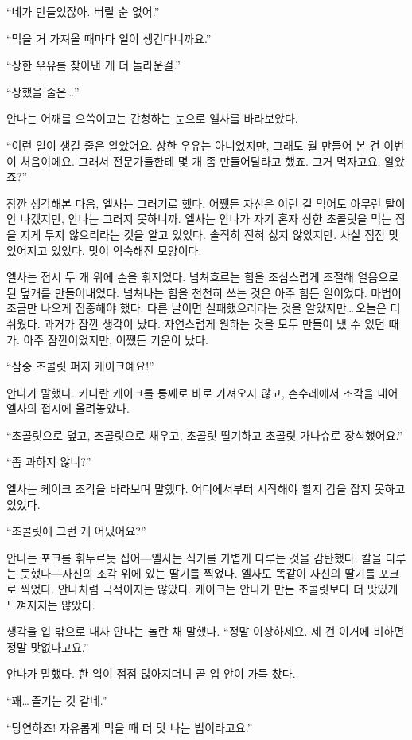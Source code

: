 ``네가 만들었잖아. 버릴 순 없어.''

``먹을 거 가져올 때마다 일이 생긴다니까요.''

``상한 우유를 찾아낸 게 더 놀라운걸.''

``상했을 줄은\ldots''

안나는 어깨를 으쓱이고는 간청하는 눈으로 엘사를 바라보았다.

``이런 일이 생길 줄은 알았어요. 상한 우유는 아니었지만, 그래도 뭘 만들어 본 건 이번이 처음이에요. 그래서 전문가들한테 몇 개 좀 만들어달라고 했죠. 그거 먹자고요, 알았죠?''

잠깐 생각해본 다음, 엘사는 그러기로 했다. 어쨌든 자신은 이런 걸 먹어도 아무런 탈이 안 나겠지만, 안나는 그러지 못하니까. 엘사는 안나가 자기 혼자 상한 초콜릿을 먹는 짐을 지게 두지 않으리라는 것을 알고 있었다. 솔직히 전혀 싫지 않았지만. 사실 점점 맛있어지고 있었다. 맛이 익숙해진 모양이다.

엘사는 접시 두 개 위에 손을 휘저었다. 넘쳐흐르는 힘을 조심스럽게 조절해 얼음으로 된 덮개를 만들어내었다. 넘쳐나는 힘을 천천히 쓰는 것은 아주 힘든 일이었다. 마법이 조금만 나오게 집중해야 했다. 다른 날이면 실패했으리라는 것을 알았지만\ldots\,오늘은 더 쉬웠다. 과거가 잠깐 생각이 났다. 자연스럽게 원하는 것을 모두 만들어 냈 수 있던 때가. 아주 잠깐이었지만, 어쨌든 기운이 났다.

``삼중 초콜릿 퍼지 케이크예요!''

안나가 말했다. 커다란 케이크를 통째로 바로 가져오지 않고, 손수레에서 조각을 내어 엘사의 접시에 올려놓았다.

``초콜릿으로 덮고, 초콜릿으로 채우고, 초콜릿 딸기하고 초콜릿 가나슈로 장식했어요.''

``좀 과하지 않니?''

엘사는 케이크 조각을 바라보며 말했다. 어디에서부터 시작해야 할지 감을 잡지 못하고 있었다.

``초콜릿에 그런 게 어딨어요?''

안나는 포크를 휘두르듯 집어—엘사는 식기를 가볍게 다루는 것을 감탄했다. 칼을 다루는 듯했다—자신의 조각 위에 있는 딸기를 찍었다. 엘사도 똑같이 자신의 딸기를 포크로 찍었다. 안나처럼 극적이지는 않았다. 케이크는 안나가 만든 초콜릿보다 더 맛있게 느껴지지는 않았다.

생각을 입 밖으로 내자 안나는 놀란 채 말했다. ``정말 이상하세요. 제 건 이거에 비하면 정말 맛없다고요.''

안나가 말했다. 한 입이 점점 많아지더니 곧 입 안이 가득 찼다.

``꽤\ldots\,즐기는 것 같네.''

``당연하죠! 자유롭게 먹을 때 더 맛 나는 법이라고요.''

